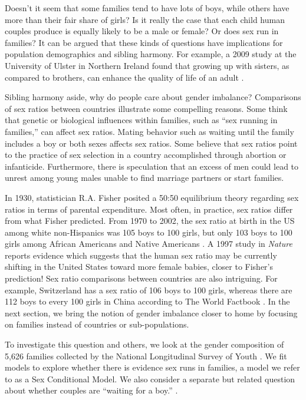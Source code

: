 \documentclass[
]{krantz}
\begin{document}
Doesn't it seem that some families tend to have lots of boys, while others have more than their fair share of girls? Is it really the case that each child human couples produce is equally likely to be a male or female? Or does sex run in families? It can be argued that these kinds of questions have implications for population demographics and sibling harmony. For example, a 2009 study at the University of Ulster in Northern Ireland found that growing up with sisters, as compared to brothers, can enhance the quality of life of an adult \citep{BBCNEWS1995}.

Sibling harmony aside, why do people care about gender imbalance? Comparisons of sex ratios between countries illustrate some compelling reasons. Some think that genetic or biological influences within families, such as ``sex running in families,'' can affect sex ratios. Mating behavior such as waiting until the family includes a boy or both sexes affects sex ratios. Some believe that sex ratios point to the practice of sex selection in a country accomplished through abortion or infanticide. Furthermore, there is speculation that an excess of men could lead to unrest among young males unable to find marriage partners or start families.

In 1930, statistician R.A. Fisher posited a 50:50 equilibrium theory regarding sex ratios in terms of parental expenditure. Most often, in practice, sex ratios differ from what Fisher predicted. From 1970 to 2002, the sex ratio at birth in the US among white non-Hispanics was 105 boys to 100 girls, but only 103 boys to 100 girls among African Americans and Native Americans \citep{Mathews2005}. A 1997 study in \emph{Nature} reports evidence which suggests that the human sex ratio may be currently shifting in the United States toward more female babies, closer to Fisher's prediction! \citep{Komdeur1997} Sex ratio comparisons between countries are also intriguing. For example, Switzerland has a sex ratio of 106 boys to 100 girls, whereas there are 112 boys to every 100 girls in China according to The World Factbook \citep{CIA2013}. In the next section, we bring the notion of gender imbalance closer to home by focusing on families instead of countries or sub-populations.

To investigate this question and others, we look at the gender composition of 5,626 families collected by the National Longitudinal Survey of Youth \citep{NLSY1997}. We fit models to explore whether there is evidence sex runs in families, a model we refer to as a Sex Conditional Model. We also consider a separate but related question about whether couples are ``waiting for a boy.'' \citep{Rodgers2001}.
\end{document}
